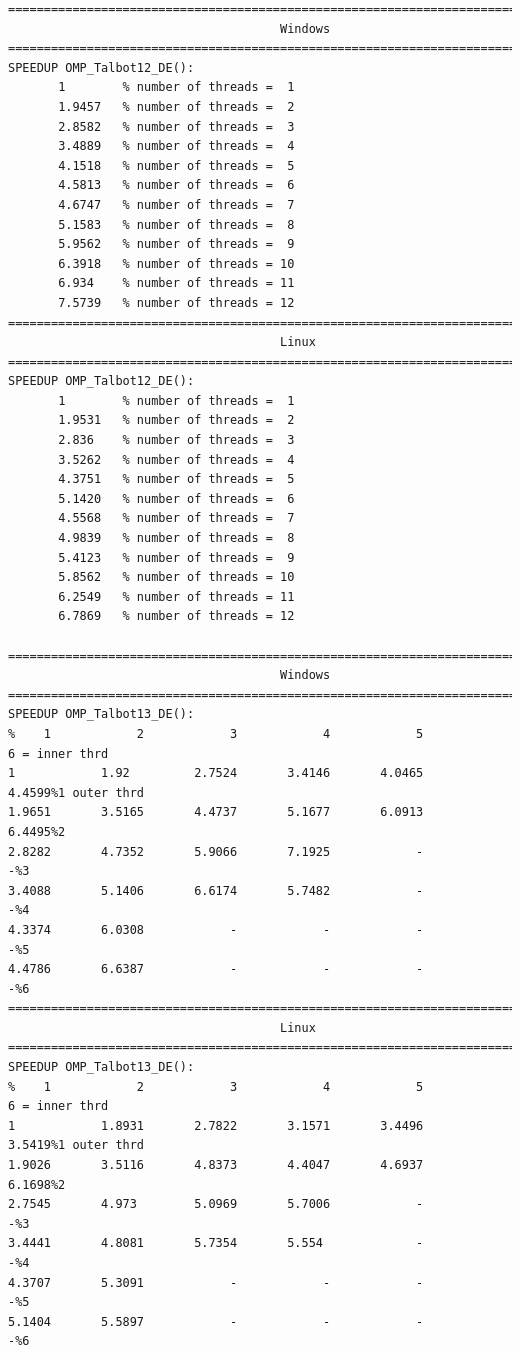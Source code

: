 \documentclass[a4paper,10pt]{report}%
\begin{document}
\begin{lstlisting}
====================================================================================
                                      Windows
====================================================================================
SPEEDUP OMP_Talbot12_DE():
       1        % number of threads =  1
       1.9457   % number of threads =  2
       2.8582   % number of threads =  3
       3.4889   % number of threads =  4
       4.1518   % number of threads =  5
       4.5813   % number of threads =  6
       4.6747   % number of threads =  7
       5.1583   % number of threads =  8
       5.9562   % number of threads =  9
       6.3918   % number of threads = 10
       6.934    % number of threads = 11
       7.5739   % number of threads = 12
====================================================================================
                                      Linux
====================================================================================
SPEEDUP OMP_Talbot12_DE():
       1        % number of threads =  1
       1.9531   % number of threads =  2
       2.836    % number of threads =  3
       3.5262   % number of threads =  4
       4.3751   % number of threads =  5
       5.1420   % number of threads =  6
       4.5568   % number of threads =  7
       4.9839   % number of threads =  8
       5.4123   % number of threads =  9
       5.8562   % number of threads = 10
       6.2549   % number of threads = 11
       6.7869   % number of threads = 12

====================================================================================
                                      Windows
====================================================================================
SPEEDUP OMP_Talbot13_DE():
%    1            2            3            4            5            6 = inner thrd
1            1.92         2.7524       3.4146       4.0465       4.4599%1 outer thrd
1.9651       3.5165       4.4737       5.1677       6.0913       6.4495%2
2.8282       4.7352       5.9066       7.1925            -            -%3
3.4088       5.1406       6.6174       5.7482            -            -%4
4.3374       6.0308            -            -            -            -%5
4.4786       6.6387            -            -            -            -%6
====================================================================================
                                      Linux
====================================================================================
SPEEDUP OMP_Talbot13_DE():
%    1            2            3            4            5            6 = inner thrd
1            1.8931       2.7822       3.1571       3.4496       3.5419%1 outer thrd
1.9026       3.5116       4.8373       4.4047       4.6937       6.1698%2
2.7545       4.973        5.0969       5.7006            -            -%3
3.4441       4.8081       5.7354       5.554             -            -%4
4.3707       5.3091            -            -            -            -%5
5.1404       5.5897            -            -            -            -%6
\end{lstlisting}
\end{document}
